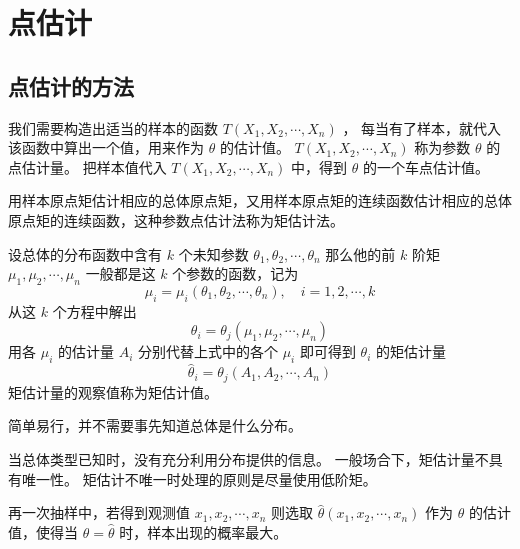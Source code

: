 \section{点估计}

\subsection{点估计的方法}

 我们需要构造出适当的样本的函数 $ T(X_1,X_2, \cdots, X_n) $ ，
每当有了样本，就代入该函数中算出一个值，用来作为 $ \theta $ 的估计值。
$ T(X_1,X_2, \cdots, X_n) $ 称为参数 $ \theta $ 的点估计量。
把样本值代入 $ T(X_1,X_2, \cdots, X_n) $ 中，得到 $ \theta $ 的一个车点估计值。

 用样本原点矩估计相应的总体原点矩，又用样本原点矩的连续函数估计相应的总体原点矩的连续函数，这种参数点估计法称为矩估计法。

 设总体的分布函数中含有 $ k $ 个未知参数 $ \theta_1, \theta_2, \cdots, \theta_n $
那么他的前 $ k $ 阶矩 $ \mu_1, \mu_2, \cdots, \mu_n $ 一般都是这 $ k $ 个参数的函数，记为
$$ \mu_i = \mu_i(\theta_1, \theta_2, \cdots, \theta_n), \quad i = 1, 2, \cdots, k $$
从这 $ k $ 个方程中解出
$$ \theta_i = \theta_j (\mu_1, \mu_2, \cdots, \mu_n) $$
用各 $ \mu_i $ 的估计量 $ A_i $ 分别代替上式中的各个 $ \mu_i $ 即可得到 $ \theta_i $ 的矩估计量
$$ \hat{\theta}_i = \theta_j (A_1, A_2, \cdots, A_n) $$
矩估计量的观察值称为矩估计值。

 简单易行，并不需要事先知道总体是什么分布。

 当总体类型已知时，没有充分利用分布提供的信息。 一般场合下，矩估计量不具有唯一性。
矩估计不唯一时处理的原则是尽量使用低阶矩。

 再一次抽样中，若得到观测值 $ x_1, x_2, \cdots, x_n $ 则选取 $ \hat{\theta}(x_1, x_2, \cdots, x_n) $
作为 $ \theta $ 的估计值，使得当 $ \theta = \hat{\theta} $ 时，样本出现的概率最大。

